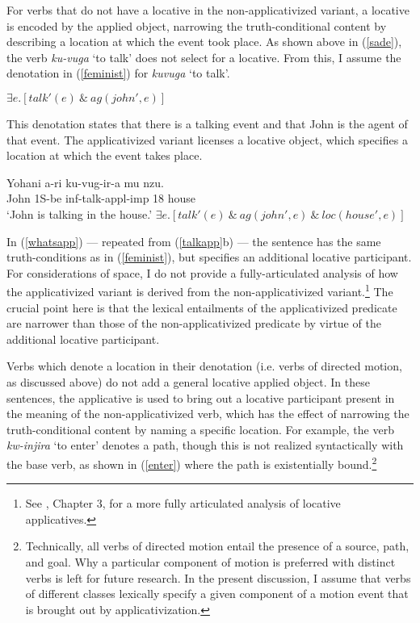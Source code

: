 \documentclass[output=paper]{langsci/langscibook}
\begin{document}
 For verbs that do not have a {\sc locative} in the non-applicativized variant, a {\sc locative} is encoded by the applied object, narrowing the truth-conditional content by describing a location at which the event took place. As shown above in (\ref{sade}), the verb \emph{ku-vuga} `to talk' does not select for a {\sc locative}. From this, I assume the denotation in (\ref{feminist}) for \emph{kuvuga} `to talk'.
 			\begin{exe}
			\ex\label{feminist} $\exists e.[talk'(e)\ \&\ ag(john',e)]$
			\end{exe}
	This denotation states that there is a talking event and that John is the {\sc agent} of that event. The applicativized variant licenses a locative object, which specifies a location at which the event takes place. 
		\begin{exe}
		\ex\begin{xlist}
		\ex\label{whatsapp}\gll Yohani a-ri ku-vug-ir-a mu nzu.\\
			John 1S-{\sc be} {\sc inf}-talk-{\sc appl-imp} 18 house\\
				\glt `John is talking in the house.'
		\ex $\exists e.[talk'(e)\ \&\ ag(john',e)\ \&\ loc(house',e) ]$
	\end{xlist}
	\end{exe}
In (\ref{whatsapp}) --- repeated from (\ref{talkapp}b) --- the sentence has the same truth-conditions as in (\ref{feminist}), but specifies an additional locative participant. For considerations of space, I do not provide a fully-articulated analysis of how the applicativized variant is derived from the non-applicativized variant.\footnote{See \citet{jerro:2016}, Chapter 3, for a more fully articulated analysis of locative applicatives.} The crucial point here is that the lexical entailments of the applicativized predicate are narrower than those of the non-applicativized predicate by virtue of the additional locative participant.	

 Verbs which denote a location in their denotation (i.e. verbs of directed motion, as discussed above) do not add a general locative applied object. In these sentences, the applicative is used to bring out a locative participant present in the meaning of the non-applicativized verb, which has the effect of narrowing the truth-conditional content by naming a specific location. For example, the verb \emph{kw-injira} `to enter' denotes a {\sc path}, though this is not realized syntactically with the base verb, as shown in (\ref{enter}) where the {\sc  path} is existentially bound.\footnote{Technically, all verbs of directed motion entail the presence of a {\sc source, path,} and {\sc goal}. Why a particular component of motion is preferred with distinct verbs is left for future research. In the present discussion, I assume that verbs of different classes lexically specify a given component of a motion event that is brought out by applicativization.}  %
\end{document}
